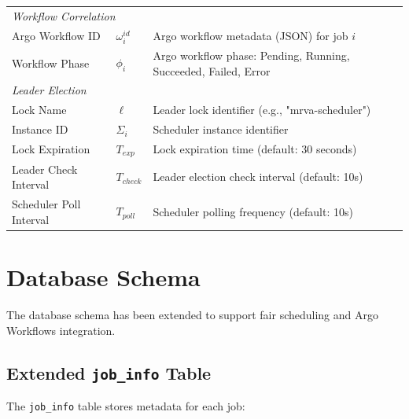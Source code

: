 \documentclass[11pt]{article}
\begin{document}
\begin{center}
\begin{longtable}{p{4cm}p{2.5cm}p{7.5cm}}
    \multicolumn{3}{l}{\textit{Workflow Correlation}} \\
    Argo Workflow ID & $\omega_i^{id}$ & Argo workflow metadata (JSON) for job $i$ \\
    Workflow Phase & $\phi_i$ & Argo workflow phase: Pending, Running, Succeeded, Failed, Error \\
    \midrule

    \multicolumn{3}{l}{\textit{Leader Election}} \\
    Lock Name & $\ell$ & Leader lock identifier (e.g., "mrva-scheduler") \\
    Instance ID & $\Sigma_i$ & Scheduler instance identifier \\
    Lock Expiration & $T_{exp}$ & Lock expiration time (default: 30 seconds) \\
    Leader Check Interval & $T_{check}$ & Leader election check interval (default: 10s) \\
    Scheduler Poll Interval & $T_{poll}$ & Scheduler polling frequency (default: 10s) \\
  \end{longtable}
\end{center}

\section{Database Schema}

The database schema has been extended to support fair scheduling and Argo Workflows integration.

\subsection{Extended \texttt{job\_info} Table}

The \texttt{job\_info} table stores metadata for each job:
\end{document}

